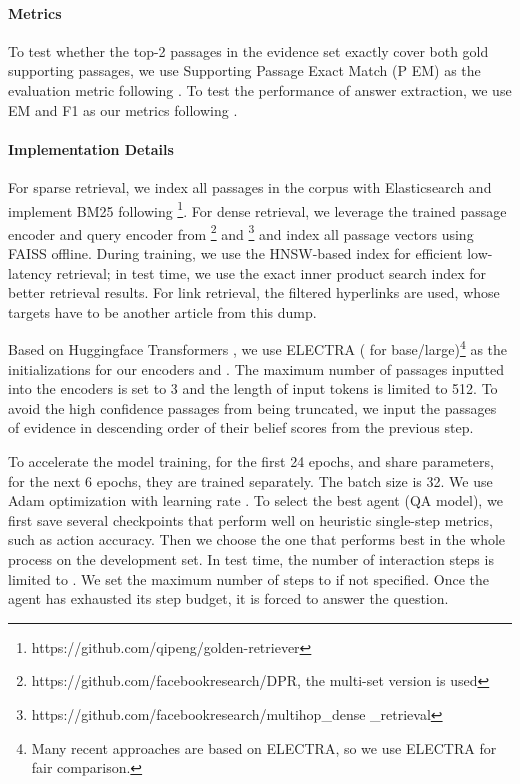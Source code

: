 \documentclass[11pt]{article}
\begin{document}
\paragraph{Metrics}
To test whether the top-2 passages in the evidence set exactly cover both gold supporting passages, we use Supporting Passage Exact Match (P EM) as the evaluation metric following \citep{Asai2020Learning}. 
To test the performance of answer extraction, we use EM and F1 as our metrics following \citep{yang-etal-2018-hotpotqa}.

\paragraph{Implementation Details}
For sparse retrieval, we index all passages in the corpus with Elasticsearch and implement BM25 following \citet{qi-etal-2019-answering}\footnote{https://github.com/qipeng/golden-retriever}.
For dense retrieval, we leverage the trained passage encoder and query encoder from \citet{karpukhin-etal-2020-dense}\footnote{https://github.com/facebookresearch/DPR, the multi-set version is used} and \citet{xiong2021answering}\footnote{https://github.com/facebookresearch/multihop\_dense \_retrieval} and index all passage vectors using FAISS \citep{johnson2019billion} offline.
During training, we use the HNSW-based index for efficient low-latency retrieval; in test time, we use the exact inner product search index for better retrieval results.
For link retrieval, the filtered hyperlinks are used, whose targets have to be another article from this dump.

Based on Huggingface Transformers \citep{wolf-etal-2020-transformers}, we use ELECTRA \citep{Clark2020ELECTRA} ( for base/large)\footnote{Many recent approaches are based on ELECTRA, so we use ELECTRA for fair comparison.} as the initializations for our encoders  and .
The maximum number of passages inputted into the encoders is set to 3 and the length of input tokens is limited to 512.
To avoid the high confidence passages from being truncated, we input the passages of evidence in descending order of their belief scores from the previous step.

To accelerate the model training, for the first 24 epochs,  and  share parameters, for the next 6 epochs, they are trained separately. 
The batch size is 32.
We use Adam optimization with learning rate .
To select the best agent (QA model), we first save several checkpoints that perform well on heuristic single-step metrics, such as action accuracy.
Then we choose the one that performs best in the whole process on the development set.
In test time, the number of interaction steps is limited to . 
We set the maximum number of steps to  if not specified.
Once the agent has exhausted its step budget, it is forced to answer the question.
\end{document}
